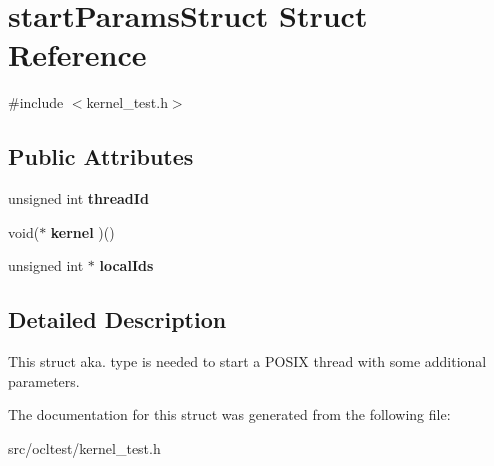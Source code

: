 \hypertarget{structstartParamsStruct}{
\section{startParamsStruct Struct Reference}
\label{structstartParamsStruct}
}


{\ttfamily \#include $<$kernel\_\-test.h$>$}

\subsection*{Public Attributes}
\begin{DoxyCompactItemize}
\item 
\hypertarget{structstartParamsStruct_a63a76bfc671e1ce940134902af326596}{
unsigned int {\bfseries threadId}}
\label{structstartParamsStruct_a63a76bfc671e1ce940134902af326596}

\item 
\hypertarget{structstartParamsStruct_ae8bdafa6f70d259729939a8037ce8c5a}{
void($\ast$ {\bfseries kernel} )()}
\label{structstartParamsStruct_ae8bdafa6f70d259729939a8037ce8c5a}

\item 
\hypertarget{structstartParamsStruct_aceb8f29818805290daeafc25cd9264d6}{
unsigned int $\ast$ {\bfseries localIds}}
\label{structstartParamsStruct_aceb8f29818805290daeafc25cd9264d6}

\end{DoxyCompactItemize}


\subsection{Detailed Description}
This struct aka. type is needed to start a POSIX thread with some additional parameters. 

The documentation for this struct was generated from the following file:\begin{DoxyCompactItemize}
\item 
src/ocltest/kernel\_\-test.h\end{DoxyCompactItemize}

